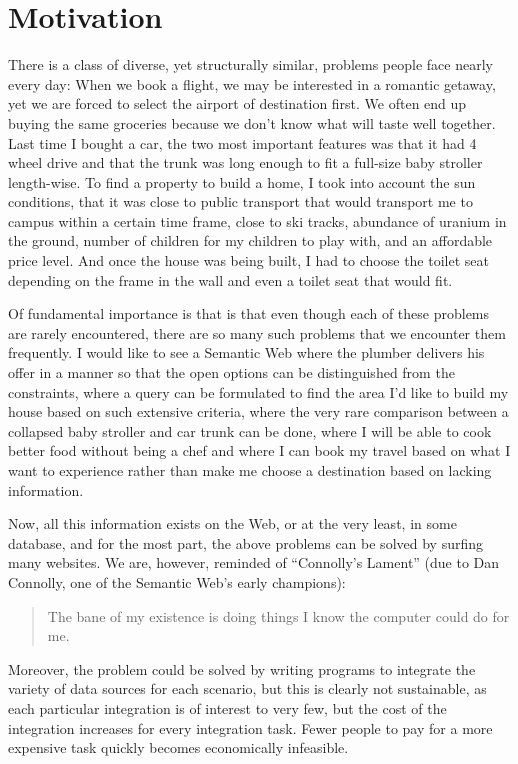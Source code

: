 \section{Motivation}\label{sec:motivation}

There is a class of diverse, yet structurally similar, problems people
face nearly every day: When we book a flight, we may be interested in
a romantic getaway, yet we are forced to select the airport of
destination first. We often end up buying the same groceries because
we don't know what will taste well together. Last time I bought a car,
the two most important features was that it had 4 wheel drive and that
the trunk was long enough to fit a full-size baby stroller
length-wise. To find a property to build a home, I took into account
the sun conditions, that it was close to public transport that would
transport me to campus within a certain time frame, close to
ski tracks, abundance of uranium in the ground, number of children for
my children to play with, and an affordable price level. And once the
house was being built, I had to choose the toilet seat depending on
the frame in the wall and even a toilet seat that would fit.

Of fundamental importance is that is that even though each of these
problems are rarely encountered, there are so many such problems that
we encounter them frequently. I would like to see a Semantic Web
where the plumber delivers his offer in a manner so that the open
options can be distinguished from the constraints, where a query can
be formulated to find the area I'd like to build my house based on
such extensive criteria, where the very rare comparison between a
collapsed baby stroller and car trunk can be done, where I will be
able to cook better food without being a chef and where I can book my
travel based on what I want to experience rather than make me choose a
destination based on lacking information.

Now, all this information exists on the Web, or at the very least, in
some database, and for the most part, the above problems can be
solved by surfing many websites. We are, however, reminded of ``Connolly's
Lament'' (due to Dan Connolly, one of the Semantic Web's early champions):
\begin{quote}
 The bane of my existence is doing things I know the computer could do
 for me.
\end{quote}

Moreover, the problem could be solved by writing programs to integrate
the variety of data sources for each scenario, but this is clearly not
sustainable, as each particular integration is of interest to very
few, but the cost of the integration increases for every integration
task. Fewer people to pay for a more expensive task quickly becomes
economically infeasible.


